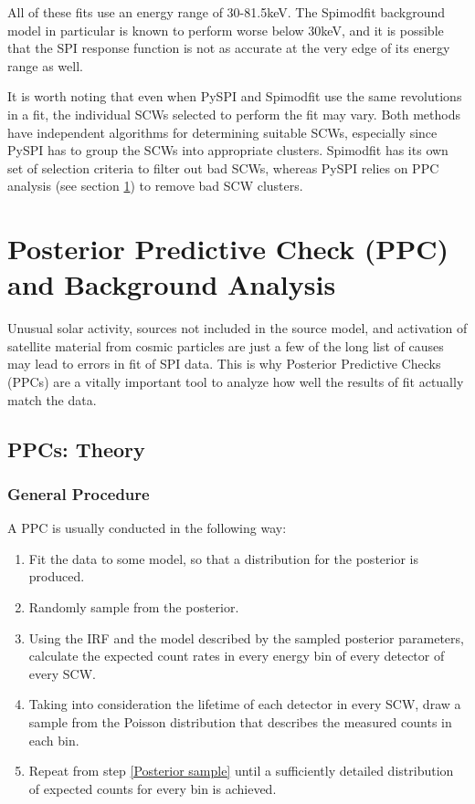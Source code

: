 \documentclass{report}
\begin{document}
All of these fits use an energy range of 30-81.5keV. The Spimodfit background model in particular is known to perform worse below 30keV, and it is possible that the SPI response function is not as accurate at the very edge of its energy range as well.


It is worth noting that even when PySPI and Spimodfit use the same revolutions in a fit, the individual SCWs selected to perform the fit may vary. Both methods have independent algorithms for determining suitable SCWs, especially since PySPI has to group the SCWs into appropriate clusters. Spimodfit has its own set of selection criteria to filter out bad SCWs, whereas PySPI relies on PPC analysis (see section \ref{sec:PPC Back}) to remove bad SCW clusters. 


\section{Posterior Predictive Check (PPC) and Background Analysis} \label{sec:PPC Back}
Unusual solar activity, sources not included in the source model, and activation of satellite material from cosmic particles are just a few of the long list of causes may lead to errors in fit of SPI data. This is why Posterior Predictive Checks (PPCs) are a vitally important tool to analyze how well the results of fit actually match the data.

\subsection{PPCs: Theory}

\subsubsection{General Procedure} \label{PPC general}

A PPC is usually conducted in the following way:

\begin{enumerate}
    \item Fit the data to some model, so that a distribution for the posterior is produced.
    \item \label{Posterior sample} Randomly sample from the posterior.
    \item \label{ppc calc count rates} Using the IRF and the model described by the sampled posterior parameters, calculate the expected count rates in every energy bin of every detector of every SCW.
    \item \label{ppc poisson sample} Taking into consideration the lifetime of each detector in every SCW, draw a sample from the Poisson distribution that describes the measured counts in each bin.
    \item Repeat from step \ref{Posterior sample} until a sufficiently detailed distribution of expected counts for every bin is achieved.
\end{enumerate}
\end{document}
